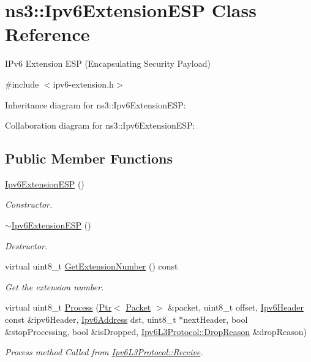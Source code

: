 \hypertarget{classns3_1_1Ipv6ExtensionESP}{}\section{ns3\+:\+:Ipv6\+Extension\+E\+SP Class Reference}
\label{classns3_1_1Ipv6ExtensionESP}


I\+Pv6 Extension E\+SP (Encapsulating Security Payload)  




{\ttfamily \#include $<$ipv6-\/extension.\+h$>$}



Inheritance diagram for ns3\+:\+:Ipv6\+Extension\+E\+SP\+:


Collaboration diagram for ns3\+:\+:Ipv6\+Extension\+E\+SP\+:
\subsection*{Public Member Functions}
\begin{DoxyCompactItemize}
\item 
\hyperlink{classns3_1_1Ipv6ExtensionESP_a6cca2d0e1b649fc018c2d192bfa4e307}{Ipv6\+Extension\+E\+SP} ()
\begin{DoxyCompactList}\small\item\em Constructor. \end{DoxyCompactList}\item 
\hyperlink{classns3_1_1Ipv6ExtensionESP_aae9b95a430806bfe72df15ce44dbfc66}{$\sim$\+Ipv6\+Extension\+E\+SP} ()
\begin{DoxyCompactList}\small\item\em Destructor. \end{DoxyCompactList}\item 
virtual uint8\+\_\+t \hyperlink{classns3_1_1Ipv6ExtensionESP_a694ce90c3cd808921f5127bf78c1851a}{Get\+Extension\+Number} () const 
\begin{DoxyCompactList}\small\item\em Get the extension number. \end{DoxyCompactList}\item 
virtual uint8\+\_\+t \hyperlink{classns3_1_1Ipv6ExtensionESP_af4a2734d836fe34fdf86ac91850c2ee9}{Process} (\hyperlink{classns3_1_1Ptr}{Ptr}$<$ \hyperlink{classns3_1_1Packet}{Packet} $>$ \&packet, uint8\+\_\+t offset, \hyperlink{classns3_1_1Ipv6Header}{Ipv6\+Header} const \&ipv6\+Header, \hyperlink{classns3_1_1Ipv6Address}{Ipv6\+Address} dst, uint8\+\_\+t $\ast$next\+Header, bool \&stop\+Processing, bool \&is\+Dropped, \hyperlink{classns3_1_1Ipv6L3Protocol_a33c64db9bc35f71ff368b132bfffa37a}{Ipv6\+L3\+Protocol\+::\+Drop\+Reason} \&drop\+Reason)
\begin{DoxyCompactList}\small\item\em Process method Called from \hyperlink{classns3_1_1Ipv6L3Protocol_a8a95d576e8aee9a571db93bf686d850a}{Ipv6\+L3\+Protocol\+::\+Receive}. \end{DoxyCompactList}\end{DoxyCompactItemize}
